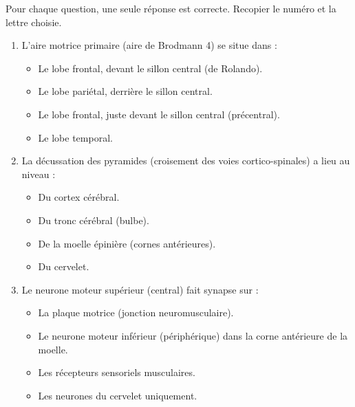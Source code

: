\documentclass[11pt]{article}
\begin{document}
\begin{exercice}
Pour chaque question, une seule réponse est correcte. Recopier le numéro et la lettre choisie.
\begin{enumerate}
    \item L'aire motrice primaire (aire de Brodmann 4) se situe dans :
    \begin{itemize}
        \item[A.] Le lobe frontal, devant le sillon central (de Rolando).
        \item[B.] Le lobe pariétal, derrière le sillon central.
        \item[C.] Le lobe frontal, juste devant le sillon central (précentral).
        \item[D.] Le lobe temporal.
    \end{itemize}
    \item La décussation des pyramides (croisement des voies cortico-spinales) a lieu au niveau :
    \begin{itemize}
        \item[A.] Du cortex cérébral.
        \item[B.] Du tronc cérébral (bulbe).
        \item[C.] De la moelle épinière (cornes antérieures).
        \item[D.] Du cervelet.
    \end{itemize}
    \item Le neurone moteur supérieur (central) fait synapse sur :
    \begin{itemize}
        \item[A.] La plaque motrice (jonction neuromusculaire).
        \item[B.] Le neurone moteur inférieur (périphérique) dans la corne antérieure de la moelle.
        \item[C.] Les récepteurs sensoriels musculaires.
        \item[D.] Les neurones du cervelet uniquement.
    \end{itemize}
\end{enumerate}
\end{exercice}
\end{document}
